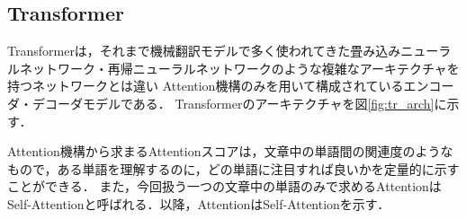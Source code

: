 \documentclass[a4paper, oneside, openany, dvipdfmx]{suribt}%
\newcommand{\fref}[1]{図\ref{#1}}
\begin{document}
\subsection{Transformer}
\label{sec:attention}
Transformerは，それまで機械翻訳モデルで多く使われてきた畳み込みニューラルネットワーク・再帰ニューラルネットワークのような複雑なアーキテクチャを持つネットワークとは違い
Attention機構のみを用いて構成されているエンコーダ・デコーダモデルである\cite{vaswani2017attention}．
Transformerのアーキテクチャを\fref{fig:tr_arch}に示す．

Attention機構から求まるAttentionスコアは，文章中の単語間の関連度のようなもので，ある単語を理解するのに，どの単語に注目すれば良いかを定量的に示すことができる．
また，今回扱う一つの文章中の単語のみで求めるAttentionはSelf-Attentionと呼ばれる．以降，AttentionはSelf-Attentionを示す．
\end{document}
